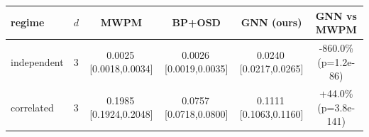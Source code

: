 \begin{tabular}{llccc c}
\toprule
regime & $d$ & MWPM & BP+OSD & GNN (ours) & GNN vs MWPM \\
\midrule
independent & 3 & 0.0025\,[0.0018,0.0034] & 0.0026\,[0.0019,0.0035] & 0.0240\,[0.0217,0.0265] & -860.0\% (p=1.2e-86) \\
\midrule
correlated & 3 & 0.1985\,[0.1924,0.2048] & 0.0757\,[0.0718,0.0800] & 0.1111\,[0.1063,0.1160] & +44.0\% (p=3.8e-141) \\
\bottomrule
\end{tabular}